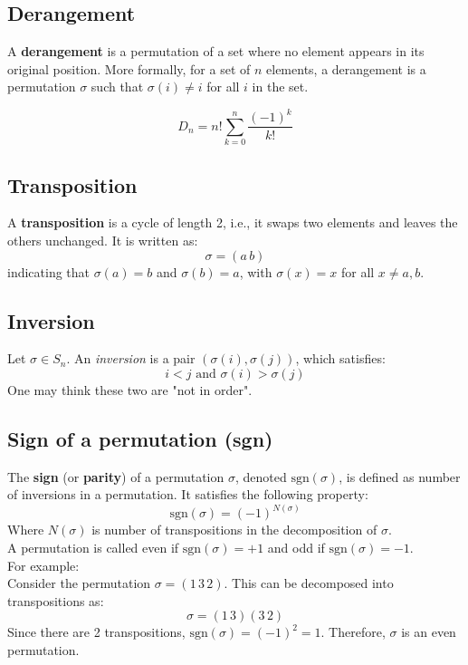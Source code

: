 \documentclass{article}
\begin{document}
\subsection{Derangement}

A \textbf{derangement} is a permutation of a set where no element appears in its original position. More formally, for a set of \( n \) elements, a derangement is a permutation \( \sigma \) such that \( \sigma(i) \neq i \) for all \( i \) in the set.

\[
D_n = n! \sum_{k=0}^{n} \frac{(-1)^k}{k!}
\]

\subsection{Transposition}
A \textbf{transposition} is a cycle of length 2, i.e., it swaps two elements and leaves the others unchanged. It is written as:
\[
\sigma = (a \, b)
\]
indicating that \(\sigma(a) = b\) and \(\sigma(b) = a\), with \(\sigma(x) = x\) for all \(x \ne a, b\).

\subsection{Inversion}

Let \(\sigma\in S_n\). An \textit{inversion} is a pair \((\sigma(i),\sigma(j))\), which satisfies:
\[i < j \text{ and } \sigma(i) > \sigma(j) \]
One may think these two are "not in order".

\subsection{Sign of a permutation (sgn)}
The \textbf{sign} (or \textbf{parity}) of a permutation \(\sigma\), denoted \(\text{sgn}(\sigma)\), is defined as number of inversions in a permutation. It satisfies the following property:
\[
\text{sgn}(\sigma) = (-1)^{N(\sigma)}
\]
Where \(N(\sigma)\) is number of transpositions in the decomposition of \(\sigma\).\\
A permutation is called even if \(\text{sgn}(\sigma) = +1\) and odd if \(\text{sgn}(\sigma) = -1\).\\
For example:\\
Consider the permutation \(\sigma = (1\, 3\, 2)\). This can be decomposed into transpositions as:
\[
\sigma = (1\, 3)(3\, 2)
\]
Since there are 2 transpositions, \(\text{sgn}(\sigma) = (-1)^2 = 1\). Therefore, \(\sigma\) is an even permutation.
\end{document}
